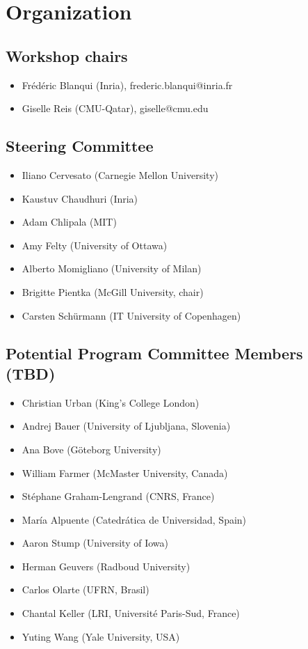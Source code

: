 \documentclass{article}
\begin{document}
\section{Organization}

\subsection{Workshop chairs}

\begin{itemize}
\item Fr\'ed\'eric Blanqui (Inria), frederic.blanqui@inria.fr
\item Giselle Reis (CMU-Qatar), giselle@cmu.edu
\end{itemize}

\subsection{Steering Committee}

\begin{itemize}
\item Iliano Cervesato (Carnegie Mellon University)
\item Kaustuv Chaudhuri (Inria)
\item Adam Chlipala (MIT)
\item Amy Felty (University of Ottawa)
\item Alberto Momigliano (University of Milan)
\item Brigitte Pientka (McGill University, chair)
\item Carsten Schürmann (IT University of Copenhagen) 
\end{itemize}

\subsection{Potential Program Committee Members (TBD)}

\begin{itemize}
\item Christian Urban (King's College London)
\item Andrej Bauer (University of Ljubljana, Slovenia)
\item Ana Bove (Göteborg University)
\item William Farmer (McMaster University, Canada)
\item Stéphane Graham-Lengrand (CNRS, France)
\item María Alpuente (Catedrática de Universidad, Spain)
\item Aaron Stump (University of Iowa) 
\item Herman Geuvers (Radboud University)
\item Carlos Olarte (UFRN, Brasil)
\item Chantal Keller (LRI, Université Paris-Sud, France)
\item Yuting Wang (Yale University, USA)
\end{itemize}
\end{document}

